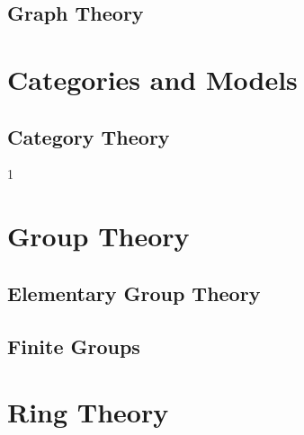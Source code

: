 \documentclass{book}                                                           %
\def\compilealgebra{1}
\begin{document}
                \chapter{Graph Theory}
                    \renewcommand{\PATH}{\PARPATH/Graph_Theory}
                    \label{chapt:Graph_Theory}%
                    
            \part{Categories and Models}
                \renewcommand{\PARPATH}{\TOPPATH/Foundations/Categories_and_Models}
                \chapter{Category Theory}
                    \renewcommand{\PATH}{\PARPATH}
                    \label{chapt:Category_Theory}%
                    
        \clearpage
        \setcounter{endpage}{\thepage}
    \fi

    \if\compilealgebra1
            \label{book:Algebra}%
            \setcounter{page}{\value{endpage}}
            \part{Group Theory}
                \renewcommand{\PARPATH}{\TOPPATH/Algebra/Group_Theory}
                \chapter{Elementary Group Theory}
                    \renewcommand{\PATH}{\PARPATH/Elementary_Group_Theory}
                    \label{chapt:Elementary_Group_Theory}%
                    
                    
                    
                \chapter{Finite Groups}
                    \renewcommand{\PATH}{\PARPATH/Finite_Groups}
                    \label{chapt:Finite_Groups}%
                    
                    
            \part{Ring Theory}
                \renewcommand{\PARPATH}{\TOPPATH/Algebra/Ring_Theory}
                
\end{document}
